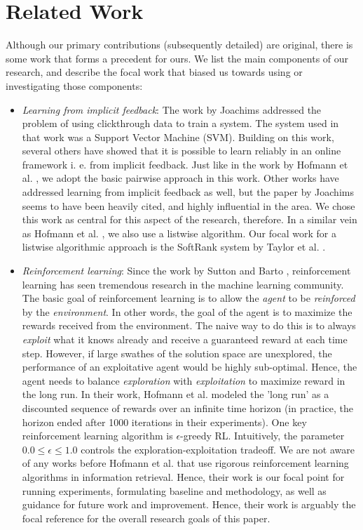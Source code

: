 \documentclass{acm_proc_article-sp}
\begin{document}
\section{Related Work}
Although our primary contributions (subsequently detailed) are original, there is some work that forms a precedent for ours. We list the main components of our research, and describe the focal work that biased us towards using or investigating those components:
\begin{itemize}
\item \emph{Learning from implicit feedback}: The work by Joachims \cite{joachims} addressed the problem of using clickthrough data to train a system. The system used in that work was a Support Vector Machine (SVM). Building on this work, several others have showed that it is possible to learn reliably in an online framework i. e. from implicit feedback. Just like in the work by Hofmann et al. \cite{hofmann}, we adopt the basic pairwise approach in this work. Other works have addressed learning from implicit feedback as well, but the paper by Joachims \cite{joachims} seems to have been heavily cited, and highly influential in the area. We chose this work as central for this aspect of the research, therefore. In a similar vein as Hofmann et al. \cite{hofmann}, we also use a listwise algorithm. Our focal work for a listwise algorithmic approach is the SoftRank system by Taylor et al. \cite{taylor}. 
\item \emph{Reinforcement learning}: Since the work by Sutton and Barto \cite{rl}, reinforcement learning has seen tremendous research in the machine learning community. The basic goal of reinforcement learning is to allow the \emph{agent} to be \emph{reinforced} by the \emph{environment}. In other words, the goal of the agent is to maximize the rewards received from the environment. The naive way to do this is to always \emph{exploit} what it knows already and receive a guaranteed reward at each time step. However, if large swathes of the solution space are unexplored, the performance of an exploitative agent would be highly sub-optimal. Hence, the agent needs to balance \emph{exploration} with \emph{exploitation} to maximize reward in the long run. In their work, Hofmann et al. modeled the 'long run' as a discounted sequence of rewards over an infinite time horizon (in practice, the horizon ended after 1000 iterations in their experiments). One key reinforcement learning algorithm is $\epsilon$-greedy RL. Intuitively, the parameter $0.0 \leq \epsilon \leq 1.0$ controls the exploration-exploitation tradeoff. We are not aware of any works before Hofmann et al. \cite{hofmann} that use rigorous reinforcement learning algorithms in information retrieval. Hence, their work is our focal point for running experiments, formulating baseline and methodology, as well as guidance for future work and improvement. Hence, their work is arguably the focal reference for the overall research goals of this paper.

\end{itemize}
\end{document}
